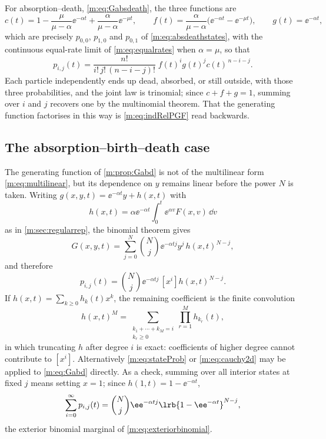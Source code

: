 For absorption--death, \cref{m:eq:Gabsdeath}, the three functions are
\begin{equation*}
c(t) = 1-\frac{\mu}{\mu-\alpha}\ee^{-\alpha t} + \frac{\alpha}{\mu-\alpha}\ee^{-\mu t},
\qquad
f(t) = \frac{\alpha}{\mu-\alpha}\bigl(\ee^{-\alpha t}-\ee^{-\mu t}\bigr),
\qquad
g(t) = \ee^{-\alpha t},
\end{equation*}
which are precisely $p_{0,0}$, $p_{1,0}$ and $p_{0,1}$ of
\cref{m:eq:absdeathstates}, with the continuous equal-rate limit of
\cref{m:eq:equalrates} when $\alpha=\mu$, so that
\begin{equation*}
p_{i,j}(t) = \frac{n!}{i!\,j!\,(n-i-j)!}\;f(t)^{i}g(t)^{j}c(t)^{\,n-i-j} .
\end{equation*}
Each particle independently ends up dead, absorbed, or still outside, with those
three probabilities, and the joint law is trinomial; since $c+f+g=1$, summing over
$i$ and $j$ recovers one by the multinomial theorem. That the generating function
factorises in this way is \cref{m:eq:indRelPGF} read backwards.

\subsection*{The absorption--birth--death case}

The generating function of \cref{m:prop:Gabd} is not of the multilinear form
\cref{m:eq:multilinear}, but its dependence on $y$ remains linear before the power
$N$ is taken. Writing $g(x,y,t) = \ee^{-\alpha t}y + h(x,t)$ with
\begin{equation*}
h(x,t) = \alpha\ee^{-\alpha t}\int_0^t\ee^{\alpha v}F(x,v)\,\dd v
\end{equation*}
as in \cref{m:sec:regularrep}, the binomial theorem gives
\begin{equation*}
G(x,y,t) = \sum_{j=0}^{N}\binom{N}{j}\ee^{-\alpha tj}y^j\,h(x,t)^{N-j},
\end{equation*}
and therefore
\begin{equation}
\label{m:eq:abdcoeffapp}
p_{i,j}(t) = \binom{N}{j}\ee^{-\alpha tj}\,[x^i]h(x,t)^{N-j} .
\end{equation}
If $h(x,t)=\sum_{k\ge0}h_k(t)x^k$, the remaining coefficient is the finite
convolution
\begin{equation*}
[x^i]h(x,t)^M
= \sum_{\substack{k_1+\cdots+k_M=i\\k_r\geq0}}\prod_{r=1}^{M}h_{k_r}(t) ,
\end{equation*}
in which truncating $h$ after degree $i$ is exact: coefficients of higher degree
cannot contribute to $[x^i]$. Alternatively \cref{m:eq:stateProb} or
\cref{m:eq:cauchy2d} may be applied to \cref{m:eq:Gabd} directly. As a check,
summing over all interior states at fixed $j$ means setting $x=1$; since
$h(1,t) = 1-\ee^{-\alpha t}$,
\begin{equation*}
\sum_{i=0}^{\infty}p_{i,j}(t)
= \binom{N}{j}\ee^{-\alpha tj}\lrb{1-\ee^{-\alpha t}}^{N-j},
\end{equation*}
the exterior binomial marginal of \cref{m:eq:exteriorbinomial}.

\renewcommand{\thesection}{\thechapter.\arabic{section}}
